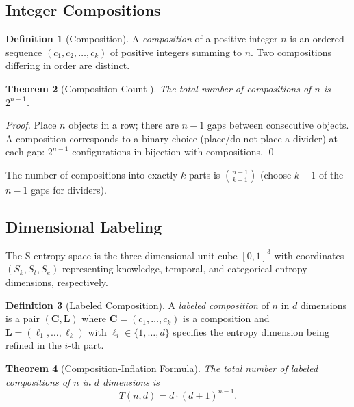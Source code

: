 \documentclass[twocolumn,10pt,a4paper]{article}
\theoremstyle{thmstyle}
\newtheorem{theorem}{Theorem}[section]
\theoremstyle{definition}
\newtheorem{definition}[theorem]{Definition}
\theoremstyle{remark}
\newcommand{\Sk}{S_{k}}
\newcommand{\St}{S_{t}}
\newcommand{\Se}{S_{e}}
\begin{document}
\subsection{Integer Compositions}

\begin{definition}[Composition]
A \emph{composition} of a positive integer $n$ is an ordered sequence
$(c_1, c_2, \ldots, c_k)$ of positive integers summing to $n$. Two
compositions differing in order are distinct.
\end{definition}

\begin{theorem}[Composition Count \citealp{andrews1976partitions}]
\label{thm:comp-count}
The total number of compositions of $n$ is $2^{n-1}$.
\end{theorem}

\begin{proof}
Place $n$ objects in a row; there are $n-1$ gaps between consecutive
objects. A composition corresponds to a binary choice (place/do not
place a divider) at each gap: $2^{n-1}$ configurations in bijection
with compositions. \qed
\end{proof}

The number of compositions into exactly $k$ parts is
$\binom{n-1}{k-1}$ (choose $k-1$ of the $n-1$ gaps for dividers).

\subsection{Dimensional Labeling}

The S-entropy space is the three-dimensional unit cube $[0,1]^3$ with
coordinates $(\Sk, \St, \Se)$ representing knowledge, temporal, and
categorical entropy dimensions, respectively.

\begin{definition}[Labeled Composition]
A \emph{labeled composition} of $n$ in $d$ dimensions is a pair
$(\mathbf{C}, \mathbf{L})$ where $\mathbf{C} = (c_1,\ldots,c_k)$ is
a composition and $\mathbf{L} = (\ell_1,\ldots,\ell_k)$ with
$\ell_i \in \{1,\ldots,d\}$ specifies the entropy dimension being
refined in the $i$-th part.
\end{definition}

\begin{theorem}[Composition-Inflation Formula]
\label{thm:inflation}
The total number of labeled compositions of $n$ in $d$ dimensions is
\begin{equation}
\label{eq:inflation}
T(n,d) = d \cdot (d+1)^{n-1}.
\end{equation}
\end{theorem}
\end{document}
